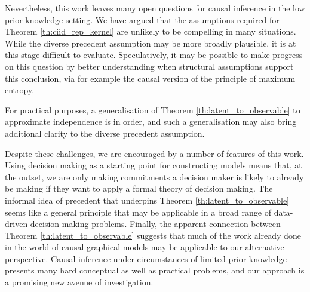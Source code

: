 Nevertheless, this work leaves many open questions for causal inference in the low prior knowledge setting. We have argued that the assumptions required for Theorem \ref{th:ciid_rep_kernel} are unlikely to be compelling in many situations. While the diverse precedent assumption may be more broadly plausible, it is at this stage difficult to evaluate. Speculatively, it may be possible to make progress on this question by better understanding when structural assumptions support this conclusion, via for example the causal version of the principle of maximum entropy.

For practical purposes, a generalisation of Theorem \ref{th:latent_to_observable} to approximate independence is in order, and such a generalisation may also bring additional clarity to the diverse precedent assumption.

Despite these challenges, we are encouraged by a number of features of this work. Using decision making as a starting point for constructing models means that, at the outset, we are only making commitments a decision maker is likely to already be making if they want to apply a formal theory of decision making. The informal idea of precedent that underpins Theorem \ref{th:latent_to_observable} seems like a general principle that may be applicable in a broad range of data-driven decision making problems. Finally, the apparent connection between Theorem \ref{th:latent_to_observable} suggests that much of the work already done in the world of causal graphical models may be applicable to our alternative perspective. Causal inference under circumstances of limited prior knowledge presents many hard conceptual as well as practical problems, and our approach is a promising new avenue of investigation.

